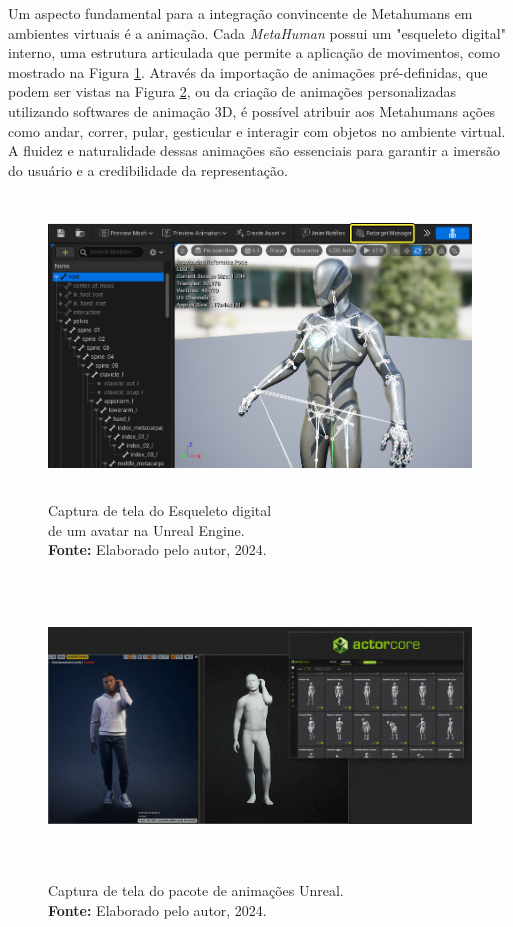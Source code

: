 Um aspecto fundamental para a integração convincente de Metahumans em ambientes virtuais é a animação. Cada \textit{MetaHuman} possui um "esqueleto digital" interno, uma estrutura articulada que permite a aplicação de movimentos, como mostrado na Figura \ref{fig:skeleton}. Através da importação de animações pré-definidas, que podem ser vistas na Figura \ref{fig:animacoes}, ou da criação de animações personalizadas utilizando softwares de animação 3D, é possível atribuir aos Metahumans ações como andar, correr, pular, gesticular e interagir com objetos no ambiente virtual. A fluidez e naturalidade dessas animações são essenciais para garantir a imersão do usuário e a credibilidade da representação.

\begin{figure}[H]
    \centering
    \includegraphics[height=8cm, keepaspectratio]{img/skeleton.png}
    \caption{Captura de tela do Esqueleto digital \\de um avatar na Unreal Engine.\\
        \textbf{Fonte:} Elaborado pelo autor, 2024.}
    \label{fig:skeleton}
\end{figure}

\begin{figure}[H]
    \centering
    \includegraphics[height=8cm, keepaspectratio]{gif/animacoes/feature_body_motion-0000.jpg}
    \caption{ Captura de tela do pacote de animações Unreal.\\
        \textbf{Fonte:} Elaborado pelo autor, 2024.}
    \label{fig:animacoes}
\end{figure}


